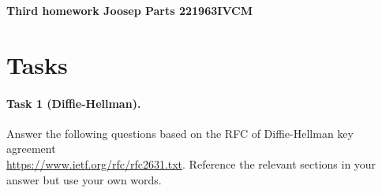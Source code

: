\documentclass{article}
\begin{document}
\begin{tcolorbox}[colframe=ttblue, colback=ttblue!10]
\begin{center}
\begin{large}
\textbf{Third homework Joosep Parts 221963IVCM}
\end{large}
\end{center}
\end{tcolorbox}

\section*{Tasks}

\paragraph{Task 1 (Diffie-Hellman).} Answer the following questions based on the RFC of Diffie-Hellman key agreement \\ \url{https://www.ietf.org/rfc/rfc2631.txt}. Reference the relevant sections in your answer but use your own words.
\end{document}
